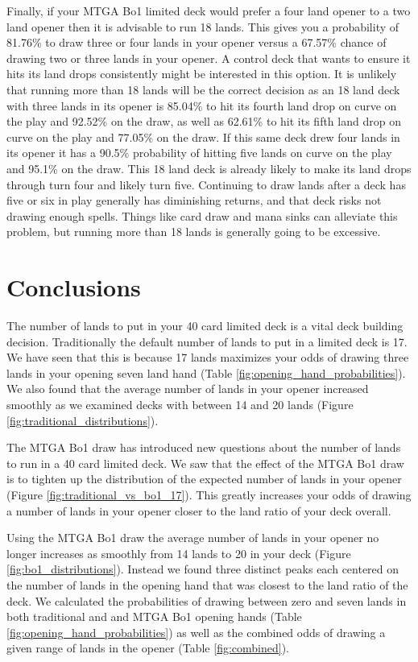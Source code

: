 \documentclass[oneside]{book}   %
\begin{document}
Finally, if your MTGA Bo1 limited deck would prefer a four land opener to a two land opener then it is advisable to run 18 lands. This gives you a probability of 81.76\% to draw three or four lands in your opener versus a 67.57\% chance of drawing two or three lands in your opener. A control deck that wants to ensure it hits its land drops consistently might be interested in this option. It is unlikely that running more than 18 lands will be the correct decision as an 18 land deck with three lands in its opener is 85.04\% to hit its fourth land drop on curve on the play and 92.52\% on the draw, as well as 62.61\% to hit its fifth land drop on curve on the play and 77.05\% on the draw. If this same deck drew four lands in its opener it has a 90.5\% probability of hitting five lands on curve on the play and 95.1\% on the draw. This 18 land deck is already likely to make its land drops through turn four and likely turn five. Continuing to draw lands after a deck has five or six in play generally has diminishing returns, and that deck risks not drawing enough spells. Things like card draw and mana sinks can alleviate this problem, but running more than 18 lands is generally going to be excessive. 

\chapter{Conclusions}

The number of lands to put in your 40 card limited deck is a vital deck building decision. Traditionally the default number of lands to put in a limited deck is 17. We have seen that this is because 17 lands maximizes your odds of drawing three lands in your opening seven land hand (Table \ref{fig:opening_hand_probabilities}). We also found that the average number of lands in your opener increased smoothly as we examined decks with between 14 and 20 lands (Figure \ref{fig:traditional_distributions}).   

The MTGA Bo1 draw has introduced new questions about the number of lands to run in a 40 card limited deck. We saw that the effect of the MTGA Bo1 draw is to tighten up the distribution of the expected number of lands in your opener (Figure \ref{fig:traditional_vs_bo1_17}). This greatly increases your odds of drawing a number of lands in your opener closer to the land ratio of your deck overall. 

Using the MTGA Bo1 draw the average number of lands in your opener no longer increases as smoothly from 14 lands to 20 in your deck (Figure \ref{fig:bo1_distributions}). Instead we found three distinct peaks each centered on the number of lands in the opening hand that was closest to the land ratio of the deck. We calculated the probabilities of drawing between zero and seven lands in both traditional and and MTGA Bo1 opening hands (Table \ref{fig:opening_hand_probabilities}) as well as the combined odds of drawing a given range of lands in the opener (Table \ref{fig:combined}).
\end{document}
